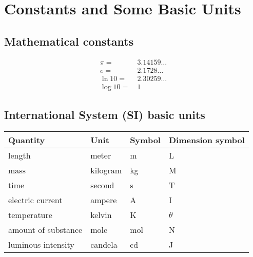 \chapter{Constants and Some Basic Units}

\section{Mathematical constants}
\begin{align*}
\pi = & \ 3.14159\ldots\\
e =  &\  2.1728\ldots\\
\ln10 =  & \  2.30259\ldots\\
\log10 =  &\  1
\end{align*}

\section{International System (SI) basic units}
\begin{table}[h]
	\centering
	\begin{tabular}{llll}
		\toprule[1.5pt]
		Quantity  &	Unit & Symbol & Dimension symbol\\
		\midrule[1pt]
		length & meter & m & L\\
		mass & kilogram & kg & M\\
		time & second & s & T\\
		electric current & ampere & A& I\\
		temperature & kelvin & K& $\theta$\\
		amount of substance & mole &   mol & N\\
		luminous intensity & candela & cd & J\\
		\bottomrule[1.5pt]
	\end{tabular}
\end{table}